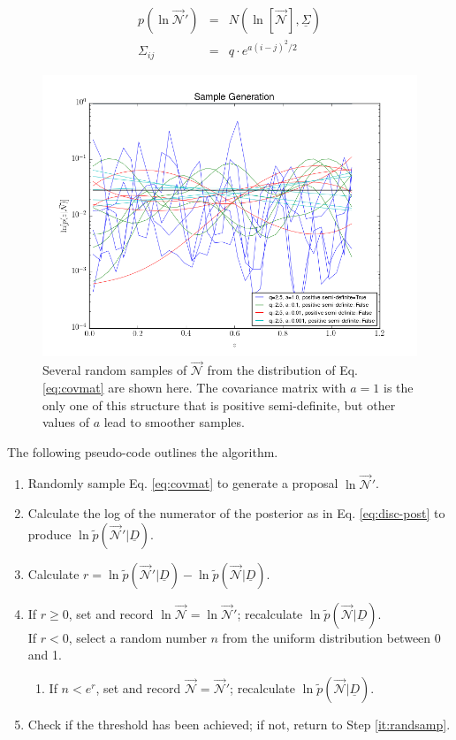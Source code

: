 \documentclass[12pt, onecolumn]{emulateapj}
\newcommand{\textul}{\underline}
\begin{document}
\begin{mathletters}
\begin{eqnarray}
\label{eq:covmat}
p(\ln\vec{\mathcal{N}}') &=& N(\ln[\vec{\mathcal{N}}],\textul{\Sigma})\\
\Sigma_{ij} &=& q\cdot e^{a(i-j)^{2}/2}\nonumber
\end{eqnarray}
\end{mathletters}

\begin{figure}
\label{fig:priors}
\includegraphics[scale=0.5]{sampgen.png}
\caption{Several random samples of $\vec{\mathcal{N}}$ from the distribution of Eq. \ref{eq:covmat} are shown here.  The covariance matrix with $a=1$ is the only one of this structure that is positive semi-definite, but other values of $a$ lead to smoother samples.}
\end{figure}

The following pseudo-code outlines the algorithm.

\begin{enumerate}
\item \label{it:randsamp} Randomly sample Eq. \ref{eq:covmat} to generate a proposal $\ln\vec{\mathcal{N}}'$.
\item Calculate the log of the numerator of the posterior as in Eq. \ref{eq:disc-post} to produce $\ln\tilde{p}(\vec{\mathcal{N}}'|\textul{D})$.
\item Calculate $r=\ln\tilde{p}(\vec{\mathcal{N}}'|\textul{D})-\ln\tilde{p}(\vec{\mathcal{N}}|\textul{D})$.
\item If $r\geq0$, set and record $\ln\vec{\mathcal{N}}=\ln\vec{\mathcal{N}}'$; recalculate $\ln\tilde{p}(\vec{\mathcal{N}}|\textul{D})$.\\
If $r<0$, select a random number $n$ from the uniform distribution between 0 and 1.
\begin{enumerate}
\item If $n<e^{r}$, set and record $\vec{\mathcal{N}}=\vec{\mathcal{N}}'$; recalculate $\ln\tilde{p}(\vec{\mathcal{N}}|\textul{D})$.
\end{enumerate}
\item Check if the threshold has been achieved; if not, return to Step \ref{it:randsamp}.
\end{enumerate}
\end{document}
